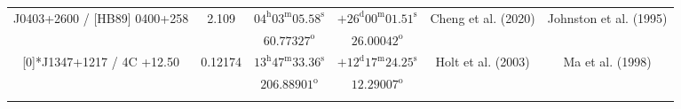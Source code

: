 \begin{landscape}
\begin{longtable}{cccccc}
  \multirow{2}[0]{*}{J0403+2600 / [HB89] 0400+258} & \multirow{2}[0]{*}{2.109} &  
    $04^\text{h}03^\text{m}05.58^\text{s}$  & $+26^\text{d}00^\text{m}01.51^\text{s}$  & 
    \multirow{2}[0]{*}{Cheng et al. (2020) \cite{RedRef20_2020}}& \multirow{2}[0]{*}{Johnston et al. (1995)\cite{CoordRef0_1995}} \\*
    & & $ 60.77327 ^\text{o}$ & $ 26.00042 ^\text{o}$ & & \\ \addlinespace 

  \multirow{2}[0]{*}{J1347+1217 / 4C +12.50} & \multirow{2}[0]{*}{0.12174} &  
    $13^\text{h}47^\text{m}33.36^\text{s}$  & $+12^\text{d}17^\text{m}24.25^\text{s}$  & 
    \multirow{2}[0]{*}{Holt et al. (2003) \cite{RedRef119_2003}}& \multirow{2}[0]{*}{Ma et al. (1998)\cite{CoordRef119_1998}} \\*
    & & $206.88901^\text{o}$ & $12.29007^\text{o}$ & & \\ \addlinespace 



    \end{longtable}
\end{landscape}































